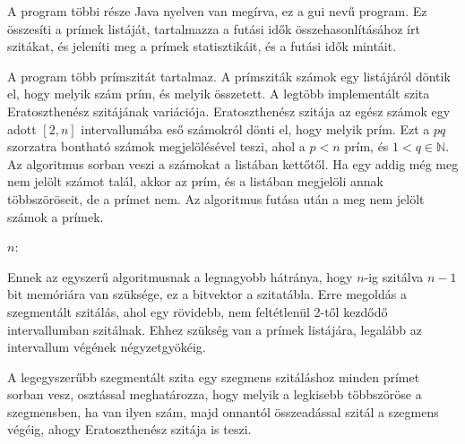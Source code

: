 A program többi része Java nyelven van megírva, ez a gui nevű program.
Ez összesíti a prímek listáját, tartalmazza a futási idők összehasonlításához
írt szitákat, és jeleníti meg a prímek statisztikáit, és a futási idők
mintáit.

A program több prímszitát tartalmaz.
A prímsziták számok egy listájáról döntik el, hogy melyik szám prím, és melyik összetett.
A legtöbb implementált szita Eratoszthenész szitájának variációja.
Eratoszthenész szitája az egész számok egy adott $[2, n]$ intervallumába
eső számokról dönti el, hogy melyik prím.
Ezt a $pq$ szorzatra bontható számok megjelölésével teszi,
ahol a $p<n$ prím, és $1<q\in\mathbb{N}$.
Az algoritmus sorban veszi a számokat a listában kettőtől.
Ha egy addig még meg nem jelölt számot talál,
akkor az prím, és a listában megjelöli annak többszöröseit, de a prímet nem.
Az algoritmus futása után a meg nem jelölt számok a prímek.

\begin{algorithmic}[1]
\State $n$: 
\State {}
			\State {}
		\EndFor
	\EndIf
\EndFor
\end{algorithmic}

Ennek az egyszerű algoritmusnak a legnagyobb hátránya,
hogy $n$-ig szitálva $n-1$ bit memóriára van szüksége,
ez a bitvektor a szitatábla.
Erre megoldás a szegmentált szitálás, ahol egy rövidebb,
nem feltétlenül 2-től kezdődő intervallumban szitálnak.
Ehhez szükség van a prímek listájára, legalább az intervallum végének négyzetgyökéig.

A legegyszerűbb szegmentált szita egy szegmens szitáláshoz
minden prímet sorban vesz, osztással meghatározza, hogy melyik a legkisebb
többszöröse a szegmensben, ha van ilyen szám,
majd onnantól összeadással szitál a szegmens végéig,
ahogy Eratoszthenész szitája is teszi.


